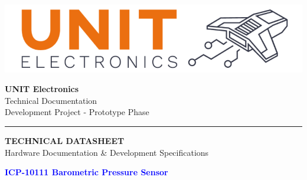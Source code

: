 \documentclass[11pt,a4paper]{article}
\begin{document}
\begin{titlepage}
    \centering
    
    \vspace*{0.5cm}
    
    \begin{minipage}{0.3\textwidth}
        \centering
        
        \includegraphics[width=\textwidth]{logo.png}
        
    \end{minipage}
    \hfill
    \begin{minipage}{0.6\textwidth}
        \raggedleft
        {\small \textbf{UNIT Electronics}}\\
        {\footnotesize Technical Documentation}\\
        {\footnotesize Development Project - Prototype Phase}
    \end{minipage}
    
    \vspace{0.5cm}
    
    {\color{blue}\rule{\textwidth}{2pt}}
    
    \vspace{1.5cm}
    
    \begin{tcolorbox}[
        colback=blue!5!white,
        colframe=blue!75!black,
        width=0.9\textwidth,
        arc=2mm,
        boxrule=1.5pt,
        halign=center
    ]
    {\Large \textbf{TECHNICAL DATASHEET}}\\[0.2cm]
    {\normalsize Hardware Documentation \& Development Specifications}
    \end{tcolorbox}
    
    \vspace{0.8cm}
    
    {\Huge \textbf{\textcolor{blue}{ICP-10111 Barometric Pressure Sensor}}}\\[0.3cm]
    
    

\end{titlepage}
\end{document}
